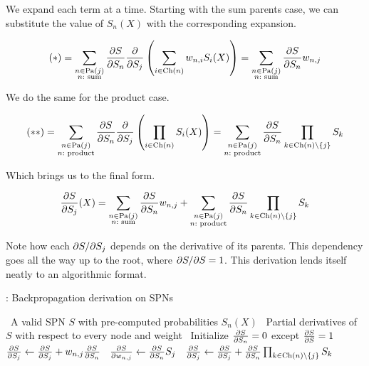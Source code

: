 We expand each term at a time. Starting with the sum parents case, we can substitute the value of
$S_n(X)$ with the corresponding expansion.

\begin{equation*}
  (\ast)=\sum_{\substack{n\in\operatorname*{\text{Pa}}(j)\\n:\text{ sum}}}\frac{\partial S}{\partial S_n}\frac{\partial}{\partial S_j}\left(\sum_{i\in\operatorname*{\text{Ch}}(n)}
    w_{n,i}S_i(X)\right)=\sum_{\substack{n\in\operatorname*{\text{Pa}}(j)\\n:\text{ sum}}}\frac{\partial S}{\partial S_n}w_{n,j}
\end{equation*}

We do the same for the product case.

\begin{equation*}
  (\ast\ast)=\sum_{\substack{n\in\operatorname*{\text{Pa}}(j)\\n:\text{ product}}}\frac{\partial S}{\partial S_n}\frac{\partial}{\partial S_j}\left(\prod_{i\in\operatorname*{\text{Ch}}(n)}
    S_i(X)\right)=\sum_{\substack{n\in\operatorname*{\text{Pa}}(j)\\n:\text{ product}}}\frac{\partial S}{\partial S_n}\prod_{k\in
      \operatorname*{\text{Ch}}(n)\setminus\{j\}}S_k
\end{equation*}

Which brings us to the final form.

\begin{equation}
  \frac{\partial S}{\partial S_j}(X)=\sum_{\substack{n\in\operatorname*{\text{Pa}}(j)\\n:\text{
        sum}}}\frac{\partial S}{\partial S_n}w_{n,j}+\sum_{\substack{n\in\operatorname*{\text{Pa}}(j)\\n: \text{
        product}}}\frac{\partial S}{\partial S_n}\prod_{k\in\operatorname*{\text{Ch}}(n)\setminus\{j\}}S_k
\end{equation}

Note how each $\partial S/\partial S_j$ depends on the derivative of its parents. This dependency goes all
the way up to the root, where $\partial S/\partial S=1$. This derivation lends itself neatly to an
algorithmic format.

\begin{algorithm}[H]
  \caption{: Backpropagation derivation on SPNs}
  \begin{algorithmic}[1]
    \Require\, A valid SPN $S$ with pre-computed probabilities $S_n(X)$
    \Ensure\, Partial derivatives of $S$ with respect to every node and weight
    \State\, Initialize $\frac{\partial S}{\partial S_n}=0$ except $\frac{\partial S}{\partial S}=1$
          \State\, $\frac{\partial S}{\partial S_j}\gets\frac{\partial S}{\partial S_j}+w_{n,j}\frac{\partial S}{\partial S_n}$
          \State\, $\frac{\partial S}{\partial w_{n,j}}\gets\frac{\partial S}{\partial S_n}S_j$
        \EndFor%
      \Else%
          \State\, $\frac{\partial S}{\partial S_j}\gets\frac{\partial S}{\partial S_j}+\frac{\partial S}{\partial S_n}\prod_{k\in\operatorname*{\text{Ch}}(n)\setminus
            \{j\}}S_k$
        \EndFor%
      \EndIf
    \EndFor%
  \end{algorithmic}
\end{algorithm}

